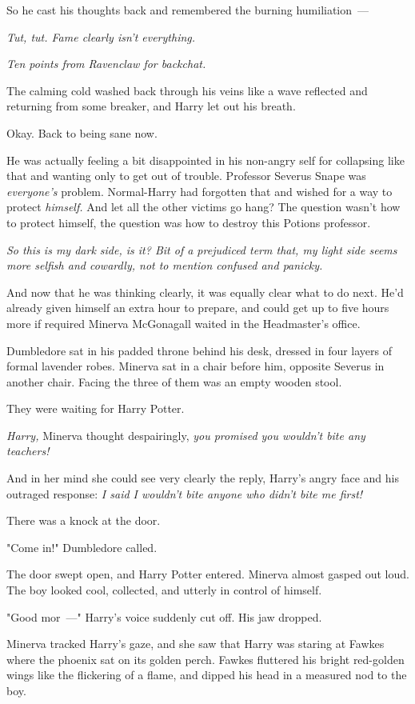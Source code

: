 So he cast his thoughts back and remembered the burning humiliation~---

\emph{Tut, tut. Fame clearly isn't everything.}

\emph{Ten points from Ravenclaw for backchat.}

The calming cold washed back through his veins like a wave reflected and
returning from some breaker, and Harry let out his breath.

Okay. Back to being sane now.

He was actually feeling a bit disappointed in his non-angry self for collapsing
like that and wanting only to get out of trouble. Professor Severus Snape was
\emph{everyone's} problem. Normal-Harry had forgotten that and wished for a way
to protect \emph{himself.} And let all the other victims go hang? The question
wasn't how to protect himself, the question was how to destroy this Potions
professor.

\emph{So this is my dark side, is it? Bit of a prejudiced term that, my light
side seems more selfish and cowardly, not to mention confused and panicky.}

And now that he was thinking clearly, it was equally clear what to do next.
He'd already given himself an extra hour to prepare, and could get up to five
hours more if required{\el}
\sbreak
Minerva McGonagall waited in the Headmaster's office.

Dumbledore sat in his padded throne behind his desk, dressed in four layers of
formal lavender robes. Minerva sat in a chair before him, opposite Severus in
another chair. Facing the three of them was an empty wooden stool.

They were waiting for Harry Potter.

\emph{Harry,} Minerva thought despairingly, \emph{you promised you wouldn't
bite any teachers!}

And in her mind she could see very clearly the reply, Harry's angry face and
his outraged response: \emph{I said I wouldn't bite anyone who didn't bite me
first!}

There was a knock at the door.

"Come in!" Dumbledore called.

The door swept open, and Harry Potter entered. Minerva almost gasped out loud.
The boy looked cool, collected, and utterly in control of himself.

"Good mor~---" Harry's voice suddenly cut off. His jaw dropped.

Minerva tracked Harry's gaze, and she saw that Harry was staring at Fawkes
where the phoenix sat on its golden perch. Fawkes fluttered his bright
red-golden wings like the flickering of a flame, and dipped his head in a
measured nod to the boy.

